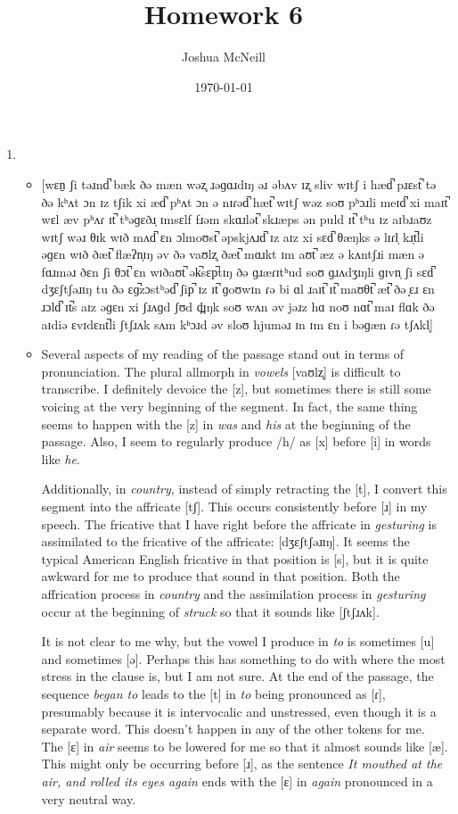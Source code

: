 \documentclass{article}
\author{Joshua McNeill}
\title{Homework 6}
\date{\today}
\newcommand{\lexi}[1]{\textit{#1}}
\begin{document}
  \maketitle
  \begin{enumerate}
    \item
    \begin{itemize}
      \item {[}wɛn̠ ʃi təɹnd̚ bæk ðə mæn wəz̥ ɹəɡɑɹdɪŋ əɹ əbʌv ɪz̥ sliv wɪtʃ i hæd̚ pɹɛst̚ tə ðə kʰʌt ɔn ɪz tʃik xi æd̚ pʰʌt ɔn ə nɪɾəd̚ hæt̚ wɪtʃ wəz soʊ pʰɔɹli meɪd̚ xi maɪt̚ wɛl æv pʰʌɾ ɪt̚ tʰəɡɛðɹ̩ ɪmsɛlf fɹəm skɑɹlət̚ skɹæps ən puld ɪt̚ tʰu ɪz aɪbɹaʊz wɪtʃ wəɹ θɪk wɪð mʌd̚ ɛn ɔlmoʊst̚ əpskjʌɹd̚ ɪz aɪz xi sɛd̚ θæŋks ə lɪɾl̩ kɹ̩t̚li əɡɛn wɪð ðæt̚ flæʔn̩ɪŋ əv ðə vaʊlz̥ ðæt̚ mɑɹkt ɪm aʊt̚ æz ə kʌntʃɹi mæn ə fɑɹməɹ ðɛn ʃi θɔt̚ ɛn wɪðaʊt̚ ək̚sɛp̚tɪŋ ðə ɡɹæɾɪtʰud soʊ ɡɹʌdʒɪŋli ɡɪvn̩ ʃi sɛd̚ dʒɛʃtʃəɹɪŋ tu ðə ɛɡ̚zɔstʰəd̚ ʃip̚ ɪz ɪt̚ ɡoʊwɪn ɾə bi ɑl ɹaɪt̚ ɪt̚ maʊθt̚ æt̚ ðə ̝ɛɹ ɛn ɹɔld̚ ɪt̚s aɪz əɡɛn xi ʃɹʌɡd ʃʊd d̪ɪŋk soʊ wʌn əv jəɹz hɑ noʊ nɑt̚ maɪ flɑk ðə aɪdiə ɛvɪdɛnt̚li ʃtʃɹʌk sʌm kʰɔɹd əv sloʊ hjuməɹ ɪn ɪm ɛn i bəɡæn ɾə tʃʌkl̩]
      \item Several aspects of my reading of the passage stand out in terms of pronunciation.
      The plural allmorph in \lexi{vowels} [vaʊlz̥] is difficult to transcribe.
      I definitely devoice the [z], but sometimes there is still some voicing at the very beginning of the segment.
      In fact, the same thing seems to happen with the [z] in \lexi{was} and \lexi{his} at the beginning of the passage.
      Also, I seem to regularly produce /h/ as [x] before [i] in words like \lexi{he}.

      Additionally, in \lexi{country}, instead of simply retracting the [t], I convert this segment into the affricate [tʃ].
      This occurs consistently before [ɹ] in my speech.
      The fricative that I have right before the affricate in \lexi{gesturing} is assimilated to the fricative of the affricate: [dʒɛʃtʃəɹɪŋ].
      It seems the typical American English fricative in that position is [s], but it is quite awkward for me to produce that sound in that position.
      Both the affrication process in \lexi{country} and the assimilation process in \lexi{gesturing} occur at the beginning of \lexi{struck} so that it sounds like [ʃtʃɹʌk].

      It is not clear to me why, but the vowel I produce in \lexi{to} is sometimes [u] and sometimes [ə].
      Perhaps this has something to do with where the most stress in the clause is, but I am not sure.
      At the end of the passage, the sequence \lexi{began to} leads to the [t] in \lexi{to} being pronounced as [ɾ], presumably because it is intervocalic and unstressed, even though it is a separate word.
      This doesn't happen in any of the other tokens for me.
      The [ɛ] in \lexi{air} seems to be lowered for me so that it almost sounds like [æ].
      This might only be occurring before [ɹ], as the sentence \lexi{It mouthed at the air, and rolled its eyes again} ends with the [ɛ] in \lexi{again} pronounced in a very neutral way.


\end{itemize}
\end{enumerate}
\end{document}
